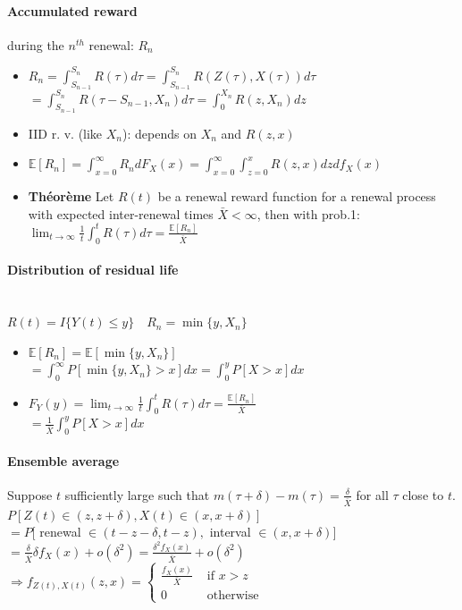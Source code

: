 \documentclass[paper=a4,fontsize=8pt,pagesize,DIV=calc]{scrartcl}
\newcounter{row}
\begin{document}
\begin{multicols}{3}
\paragraph{Accumulated reward} during the $n^{th}$ renewal: $R_n$ 
\begin{itemize}
\item $R_n =\int^{S_n}_{S_{n-1}} R(\tau )d\tau =\int^{S_n}_{S_{n-1}} R(Z(\tau ), X(\tau ))d\tau$\\$=\int^{S_n}_{S_{n-1}} R(\tau-S_{n-1},X_n)d\tau = \int^{X_n}_0 R(z, X_n)dz$
\item IID r. v. (like $X_n$): depends on $X_n$ and $R(z,x)$
\item $\mathbb{E}[R_n] =\int_{x=0}^{\infty}R_ndF_X(x)=\int_{x=0}^{\infty}\int_{z=0}^xR(z,x)dz df_X(x)$
\item \textbf{Théorème} Let $R(t)$ be a renewal reward function for a renewal process with expected inter-renewal times $\bar{X}<\infty$, then with prob.1: $\lim_{t\to\infty} \frac{1}{t}\int_0^t R(\tau)d\tau=\frac{\mathbb{E}[R_n]}{\bar{X}}$
\end{itemize}
\paragraph{Distribution of residual life}~~\\
$R(t)=I\{Y(t)\leq y\} \quad R_n=\min\{y,X_n\}$
\begin{itemize}
\item $\mathbb{E}[R_n] = \mathbb{E}[\min \{y,X_n\}]$\\$=\int_0^\infty P[\min\{ y,X_n\} >x]dx=\int_0^y P[X>x]dx$
\item $F_Y (y) =\lim_{t\to\infty} \frac{1}{t}\int_0^t R(\tau )d\tau =\frac{\mathbb{E}[R_n]}{\bar{X}}$\\$=\frac{1}{\bar{X}}\int_0^y  P[X>x]dx$
\end{itemize}
\paragraph{Ensemble average}
Suppose $t$ sufficiently large such that $m(\tau+\delta) - m(\tau ) =\frac{\delta }{\bar{X}}$ for
all $\tau$ close to $t$.
\\$P[Z(t)\in (z, z + \delta), X(t) \in (x, x + \delta)]$
\\$= P[$ renewal $ \in (t- z-\delta, t-z),$  interval $\in(x, x + \delta)]$
\\$=\frac{\delta}{\bar{X}}\delta f_X(x)+ o(\delta^2) = \frac{\delta^2f_X (x)}{\bar{X}}+ o(\delta^2)$
\\$\Rightarrow f_{Z(t),X(t)}(z, x) =\begin{cases} \frac{f_X (x)}{\bar{X}}& \text{ if } x > z\\ 0 & \text{ otherwise }\end{cases}$

\end{multicols}
\end{document}
